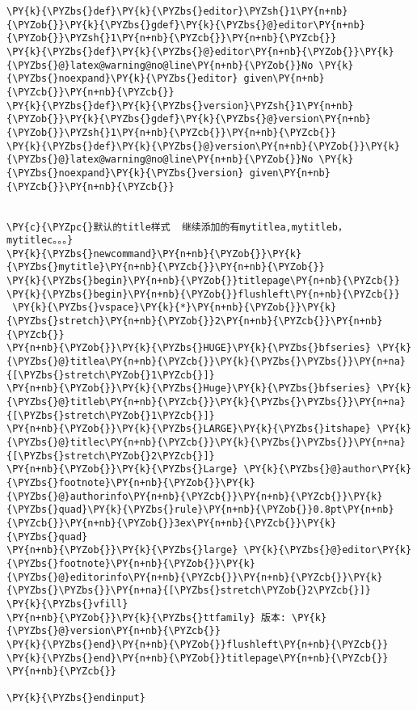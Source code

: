\begin{Verbatim}[commandchars=\\\{\}]
\PY{k}{\PYZbs{}def}\PY{k}{\PYZbs{}editor}\PYZsh{}1\PY{n+nb}{\PYZob{}}\PY{k}{\PYZbs{}gdef}\PY{k}{\PYZbs{}@}editor\PY{n+nb}{\PYZob{}}\PYZsh{}1\PY{n+nb}{\PYZcb{}}\PY{n+nb}{\PYZcb{}}
\PY{k}{\PYZbs{}def}\PY{k}{\PYZbs{}@}editor\PY{n+nb}{\PYZob{}}\PY{k}{\PYZbs{}@}latex@warning@no@line\PY{n+nb}{\PYZob{}}No \PY{k}{\PYZbs{}noexpand}\PY{k}{\PYZbs{}editor} given\PY{n+nb}{\PYZcb{}}\PY{n+nb}{\PYZcb{}}
\PY{k}{\PYZbs{}def}\PY{k}{\PYZbs{}version}\PYZsh{}1\PY{n+nb}{\PYZob{}}\PY{k}{\PYZbs{}gdef}\PY{k}{\PYZbs{}@}version\PY{n+nb}{\PYZob{}}\PYZsh{}1\PY{n+nb}{\PYZcb{}}\PY{n+nb}{\PYZcb{}}
\PY{k}{\PYZbs{}def}\PY{k}{\PYZbs{}@}version\PY{n+nb}{\PYZob{}}\PY{k}{\PYZbs{}@}latex@warning@no@line\PY{n+nb}{\PYZob{}}No \PY{k}{\PYZbs{}noexpand}\PY{k}{\PYZbs{}version} given\PY{n+nb}{\PYZcb{}}\PY{n+nb}{\PYZcb{}}


\PY{c}{\PYZpc{}默认的title样式  继续添加的有mytitlea,mytitleb，mytitlec。。。}
\PY{k}{\PYZbs{}newcommand}\PY{n+nb}{\PYZob{}}\PY{k}{\PYZbs{}mytitle}\PY{n+nb}{\PYZcb{}}\PY{n+nb}{\PYZob{}}
\PY{k}{\PYZbs{}begin}\PY{n+nb}{\PYZob{}}titlepage\PY{n+nb}{\PYZcb{}}
\PY{k}{\PYZbs{}begin}\PY{n+nb}{\PYZob{}}flushleft\PY{n+nb}{\PYZcb{}}
 \PY{k}{\PYZbs{}vspace}\PY{k}{*}\PY{n+nb}{\PYZob{}}\PY{k}{\PYZbs{}stretch}\PY{n+nb}{\PYZob{}}2\PY{n+nb}{\PYZcb{}}\PY{n+nb}{\PYZcb{}}
\PY{n+nb}{\PYZob{}}\PY{k}{\PYZbs{}HUGE}\PY{k}{\PYZbs{}bfseries} \PY{k}{\PYZbs{}@}titlea\PY{n+nb}{\PYZcb{}}\PY{k}{\PYZbs{}\PYZbs{}}\PY{n+na}{[\PYZbs{}stretch\PYZob{}1\PYZcb{}]}
\PY{n+nb}{\PYZob{}}\PY{k}{\PYZbs{}Huge}\PY{k}{\PYZbs{}bfseries} \PY{k}{\PYZbs{}@}titleb\PY{n+nb}{\PYZcb{}}\PY{k}{\PYZbs{}\PYZbs{}}\PY{n+na}{[\PYZbs{}stretch\PYZob{}1\PYZcb{}]}
\PY{n+nb}{\PYZob{}}\PY{k}{\PYZbs{}LARGE}\PY{k}{\PYZbs{}itshape} \PY{k}{\PYZbs{}@}titlec\PY{n+nb}{\PYZcb{}}\PY{k}{\PYZbs{}\PYZbs{}}\PY{n+na}{[\PYZbs{}stretch\PYZob{}2\PYZcb{}]}
\PY{n+nb}{\PYZob{}}\PY{k}{\PYZbs{}Large} \PY{k}{\PYZbs{}@}author\PY{k}{\PYZbs{}footnote}\PY{n+nb}{\PYZob{}}\PY{k}{\PYZbs{}@}authorinfo\PY{n+nb}{\PYZcb{}}\PY{n+nb}{\PYZcb{}}\PY{k}{\PYZbs{}quad}\PY{k}{\PYZbs{}rule}\PY{n+nb}{\PYZob{}}0.8pt\PY{n+nb}{\PYZcb{}}\PY{n+nb}{\PYZob{}}3ex\PY{n+nb}{\PYZcb{}}\PY{k}{\PYZbs{}quad}
\PY{n+nb}{\PYZob{}}\PY{k}{\PYZbs{}large} \PY{k}{\PYZbs{}@}editor\PY{k}{\PYZbs{}footnote}\PY{n+nb}{\PYZob{}}\PY{k}{\PYZbs{}@}editorinfo\PY{n+nb}{\PYZcb{}}\PY{n+nb}{\PYZcb{}}\PY{k}{\PYZbs{}\PYZbs{}}\PY{n+na}{[\PYZbs{}stretch\PYZob{}2\PYZcb{}]}
\PY{k}{\PYZbs{}vfill}
\PY{n+nb}{\PYZob{}}\PY{k}{\PYZbs{}ttfamily} 版本: \PY{k}{\PYZbs{}@}version\PY{n+nb}{\PYZcb{}}
\PY{k}{\PYZbs{}end}\PY{n+nb}{\PYZob{}}flushleft\PY{n+nb}{\PYZcb{}}
\PY{k}{\PYZbs{}end}\PY{n+nb}{\PYZob{}}titlepage\PY{n+nb}{\PYZcb{}}
\PY{n+nb}{\PYZcb{}}

\PY{k}{\PYZbs{}endinput}
\end{Verbatim}
